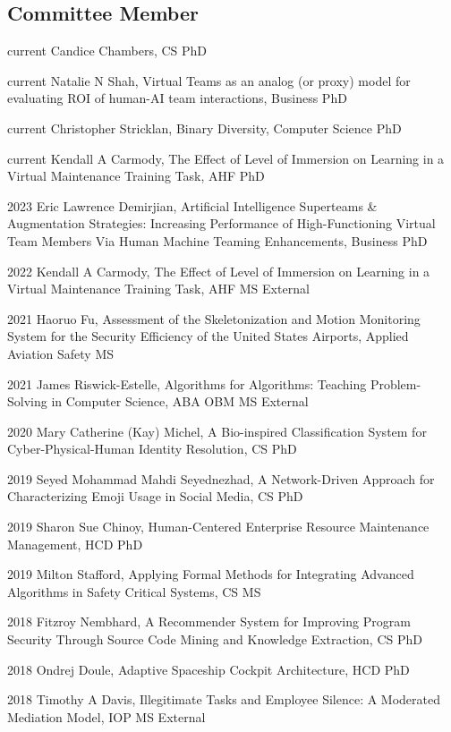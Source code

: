 \documentclass[12pt,letterpaper]{report}
\newcommand{\listitemspace}{0.25em}
\renewenvironment{itemize}
{\begin{list}{}{\setlength{\leftmargin}{0em}
                \setlength{\parskip}{0em}
                \setlength{\itemsep}{\listitemspace}
                \setlength{\parsep}{\listitemspace}}}
{\end{list}}
\begin{document}
    \subsection*{Committee Member}
    \begin{itemize}
    \item current Candice Chambers, CS PhD 
    \item current Natalie N Shah, Virtual Teams as an analog (or proxy) model for evaluating ROI of human-AI team interactions, Business PhD
    \item current Christopher Stricklan, Binary Diversity, Computer Science PhD
    \item current Kendall A Carmody, The Effect of Level of Immersion on Learning in a Virtual Maintenance Training Task, AHF PhD
    \item 2023 Eric Lawrence Demirjian, Artificial Intelligence Superteams \& Augmentation Strategies: Increasing Performance of High-Functioning Virtual Team Members Via Human Machine Teaming Enhancements, Business PhD
    \item 2022 Kendall A Carmody, The Effect of Level of Immersion on Learning in a Virtual Maintenance Training Task, AHF MS External
    \item 2021 Haoruo Fu, Assessment of the Skeletonization and Motion Monitoring System for the Security Efficiency of the United States Airports, Applied Aviation Safety MS
    \item 2021 James Riswick-Estelle, Algorithms for Algorithms: Teaching Problem-Solving in Computer Science, ABA OBM MS External
    \item 2020 Mary Catherine (Kay) Michel, A Bio-inspired Classification System for Cyber-Physical-Human Identity Resolution, CS PhD
    \item 2019 Seyed Mohammad Mahdi Seyednezhad, A Network-Driven Approach for Characterizing Emoji Usage in Social Media, CS PhD
    \item 2019 Sharon Sue Chinoy, Human-Centered Enterprise Resource Maintenance Management, HCD PhD
    \item 2019 Milton Stafford, Applying Formal Methods for Integrating Advanced Algorithms in Safety Critical Systems, CS MS
    \item 2018 Fitzroy Nembhard, A Recommender System for Improving Program Security Through Source Code Mining and Knowledge Extraction, CS PhD
    \item 2018 Ondrej Doule, Adaptive Spaceship Cockpit Architecture, HCD PhD    
    \item 2018 Timothy A Davis, Illegitimate Tasks and Employee Silence: A Moderated Mediation Model, IOP MS External

\end{itemize}
\end{document}
